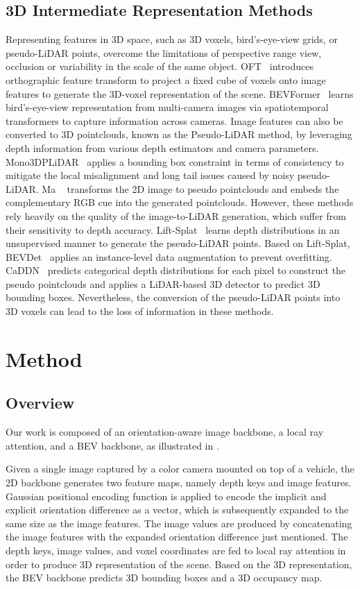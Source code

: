 \documentclass[10pt,twocolumn,letterpaper]{article}
\begin{document}
\subsection{3D Intermediate Representation Methods}
Representing features in 3D space, such as 3D voxels, bird's-eye-view grids, or pseudo-LiDAR points, overcome the limitations of perspective range view, \eg occlusion or variability in the scale of the same object. OFT~\cite{BMVC2019} introduces orthographic feature transform to project a fixed cube of voxels onto image features to generate the 3D-voxel representation of the scene. BEVFormer~\cite{li2022bevformer} learns bird's-eye-view representation from multi-camera images via spatiotemporal transformers to capture information across cameras. Image features can also be converted to 3D pointclouds, known as the Pseudo-LiDAR method, by leveraging depth information from various depth estimators and camera parameters. Mono3DPLiDAR~\cite{weng2019monocular} applies a bounding box constraint in terms of consistency to mitigate the local misalignment and long tail issues caused by noisy pseudo-LiDAR. Ma \etal~\cite{ma2019accurate} transforms the 2D image to pseudo pointclouds and embeds the complementary RGB cue into the generated pointclouds. However, these methods rely heavily on the quality of the image-to-LiDAR generation, which suffer from their sensitivity to depth accuracy. Lift-Splat~\cite{10.1007/978-3-030-58568-6_12} learns depth distributions in an unsupervised manner to generate the pseudo-LiDAR points. Based on Lift-Splat, BEVDet~\cite{Huang2021BEVDetHM} applies an instance-level data augmentation to prevent overfitting. CaDDN~\cite{reading2021categorical} predicts categorical depth distributions for each pixel to construct the pseudo pointclouds and applies a LiDAR-based 3D detector to predict 3D bounding boxes. Nevertheless, the conversion of the pseudo-LiDAR points into 3D voxels can lead to the loss of information in these methods. 
\section{Method}
\label{sec:method}
\subsection{Overview}
Our work is composed of an orientation-aware image backbone, a local ray attention, and a BEV backbone, as illustrated in .

Given a single image captured by a color camera mounted on top of a vehicle, the 2D backbone generates two feature maps, namely depth keys and image features. Gaussian positional encoding function is applied to encode the implicit and explicit orientation difference as a vector, which is subsequently expanded to the same size as the image features. The image values are produced by concatenating the image features with the expanded orientation difference just mentioned. The depth keys, image values, and voxel coordinates are fed to local ray attention in order to produce 3D representation of the scene. Based on the 3D representation, the BEV backbone predicts 3D bounding boxes and a 3D occupancy map.
\end{document}
